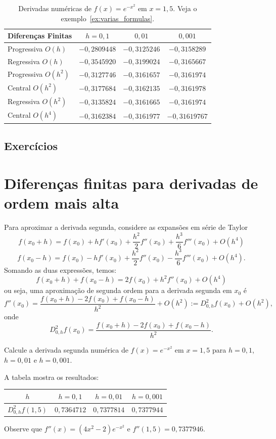 \begin{sol}
\begin{table}
  \centering
  \begin{tabular}{l|ccc}
    Diferenças Finitas & $h=0,1$ & $0,01$ & $0,001$\\\hline
    Progressiva $O(h)$ & $-0,2809448$ & $-0,3125246$ & $-0,3158289$\\
    Regressiva $O(h)$ & $-0,3545920$ & $-0,3199024$ & $-0,3165667$\\
    Progressiva $O(h^2)$ & $-0,3127746$ & $-0,3161657$ & $-0,3161974$\\
    Central $O(h^2)$ & $-0,3177684$ & $-0,3162135$ & $-0,3161978$ \\
    Regressiva $O(h^2)$ & $-0,3135824$ & $-0,3161665$ & $-0,3161974$\\
    Central $O(h^4)$ & $-0,3162384$ & $-0,3161977$ & $-0,31619767$ \\\hline
  \end{tabular}
  \caption{Derivadas numéricas de $f(x) = e^{-x^ 2}$ em $x=1,5$. Veja o exemplo~\ref{ex:varias_formulas}.}
  \label{tab:ex_varias_formulas}
\end{table}
\end{sol}

\subsection*{Exercícios}

\emconstrucao

\section{Diferenças finitas para derivadas de ordem mais alta}

Para aproximar a derivada segunda, considere as expansões em série de Taylor
$$
f(x_0+h)=f(x_0)+hf'(x_0)+\frac{h^2}{2}f''(x_0)+\frac{h^3}{6}f'''(x_0)+O(h^4)
$$
$$
f(x_0-h)=f(x_0)-hf'(x_0)+\frac{h^2}{2}f''(x_0)-\frac{h^3}{6}f'''(x_0)+O(h^4).
$$
Somando as duas expressões, temos:
$$
f(x_0+h)+f(x_0-h)=2f(x_0)+h^2f''(x_0)+O(h^4)
$$
ou seja, uma aproximação de segunda ordem para a derivada segunda em $x_0$ é
$$
f''(x_0)=\frac{f(x_0+h)-2f(x_0)+f(x_0-h)}{h^2}+O(h^2):=D^2_{0,h}f(x_0)+O(h^2),
$$
onde
$$
D^2_{0,h}f(x_0)=\frac{f(x_0+h)-2f(x_0)+f(x_0-h)}{h^2}.
$$
\begin{ex}
Calcule a derivada segunda numérica de $f(x)=e^{-x^2}$ em $x=1,5$ para $h=0,1$, $h=0,01$ e $h=0,001$.
\end{ex}
\begin{sol}
A tabela mostra os resultados:
\begin{center}
  \begin{tabular}{|c|c|c|c|}\hline
    $h$ & $h=0,1$ & $h=0,01$ & $h=0,001$\\\hline
    $D^2_{0,h}f(1,5)$ & $0,7364712$ & $0,7377814$ & $0,7377944$\\\hline
  \end{tabular}  
\end{center}
Observe que $f''(x)=(4x^2-2)e^{-x^2}$ e $f''(1,5)=0,7377946$.  
\end{sol}

